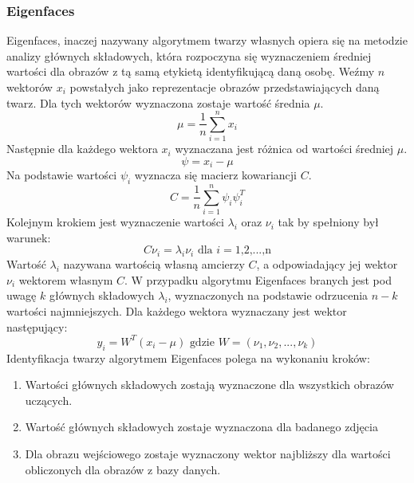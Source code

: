 \subsubsection{Eigenfaces} \label{eigen}
Eigenfaces, inaczej nazywany algorytmem twarzy własnych opiera się na metodzie analizy głównych składowych, która rozpoczyna się wyznaczeniem średniej wartości dla obrazów z tą samą etykietą identyfikującą daną osobę.
Weźmy $n$ wektorów $x_{i}$ powstałych jako reprezentacje obrazów przedstawiających daną twarz. Dla tych wektorów wyznaczona zostaje wartość średnia $\mu$.
$$
\mu=\frac{1}{n}\sum_{i=1}^{n}x_{i}
$$
Następnie dla każdego wektora $x_{i}$ wyznaczana jest różnica od wartości średniej $\mu$.
$$
\psi= x_{i}-\mu
$$
Na podstawie wartości $\psi_{i}$ wyznacza się macierz kowariancji $C$.
$$
C=\frac{1}{n}\sum_{i=1}^{n}\psi_{i}\psi_{i}^{T}
$$
Kolejnym krokiem jest wyznaczenie wartości $\lambda_{i}$ oraz $\nu_{i}$ tak by spełniony był warunek:
$$
C\nu_{i}=\lambda_{i}\nu_{i} \textrm{ dla $i=$1,2,...,n}
$$
Wartość $\lambda_{i}$ nazywana wartością własną amcierzy $C$, a odpowiadający jej wektor $\nu_{i}$ wektorem własnym $C$.
W przypadku algorytmu Eigenfaces branych jest pod uwagę $k$ głównych składowych $\lambda_{i}$, wyznaczonych na podstawie odrzucenia $n-k$ wartości najmniejszych. Dla każdego wektora wyznaczany jest wektor następujący:
$$
y_{i}=W^{T}(x_{i}-\mu) \textrm{ gdzie $W=(\nu_{1}, \nu_{2}, ..., \nu_{k})$}
$$
Identyfikacja twarzy algorytmem Eigenfaces polega na wykonaniu kroków:
\begin{enumerate}
\item Wartości głównych składowych zostają wyznaczone dla wszystkich obrazów uczących.
\item Wartość głównych składowych zostaje wyznaczona dla badanego zdjęcia
\item Dla obrazu wejściowego zostaje wyznaczony wektor najbliższy dla wartości obliczonych dla obrazów z bazy danych.
\end{enumerate}

